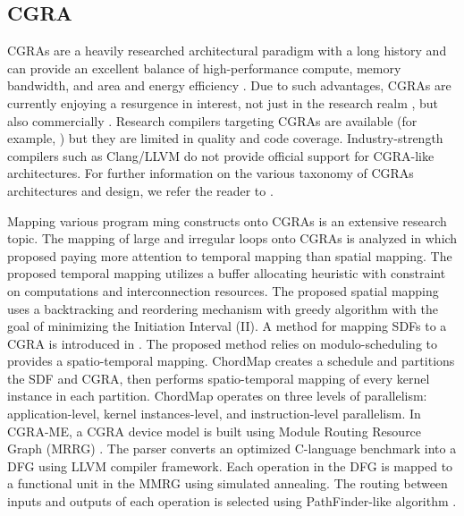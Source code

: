 \subsection{CGRA}
CGRAs are a heavily researched architectural paradigm with a long history and can provide an excellent balance of high-performance compute, memory bandwidth, and area and energy efficiency \cite{theodoridis2007survey}.
Due to such advantages, CGRAs are currently enjoying a resurgence in interest, not just in the research realm \cite{prabhakar2018plasticine}, but also commercially \cite{morgan2018intel, nicol2017coarse, vissers2019versal}.
Research compilers targeting CGRAs are available (for example, \cite{adriaansen2016code, chin_cgra-me_2017, mei2003exploiting, prabhakar2018plasticine}) but they are limited in quality and code coverage. 
Industry-strength compilers such as Clang/LLVM do not provide official support for CGRA-like architectures.
For further information on the various taxonomy of CGRAs architectures and design, we refer the reader to \cite{liu_survey_2019, tehre_survey_2012}.

Mapping various program
ming constructs onto CGRAs is an extensive research topic.
The  mapping of large and irregular loops onto CGRAs is analyzed in \cite{zhao_towards_2020} which proposed paying more attention to temporal mapping than spatial mapping. 
The proposed temporal mapping utilizes a buffer allocating heuristic with constraint on computations and interconnection resources. 
The proposed spatial mapping uses a backtracking and reordering mechanism with greedy algorithm with the goal of minimizing the Initiation Interval (II).
A method for mapping SDFs to a CGRA is introduced in \cite{li_chordmap_2022}.
The proposed method relies on modulo-scheduling to provides a spatio-temporal mapping.
ChordMap creates a schedule and partitions the SDF and CGRA, then performs spatio-temporal mapping of every kernel instance in each partition.
ChordMap operates on three levels of parallelism: application-level, kernel instances-level, and instruction-level parallelism.
In CGRA-ME\cite{chin_cgra-me_2017}, a CGRA device model is built using Module Routing Resource Graph (MRRG) \cite{mrrg}. 
The parser converts an optimized C-language benchmark into a DFG using LLVM compiler framework. 
Each operation in the DFG is mapped to a functional unit in the MMRG using simulated annealing. 
The routing between inputs and outputs of each operation is selected using PathFinder-like algorithm \cite{pathfinder}.

